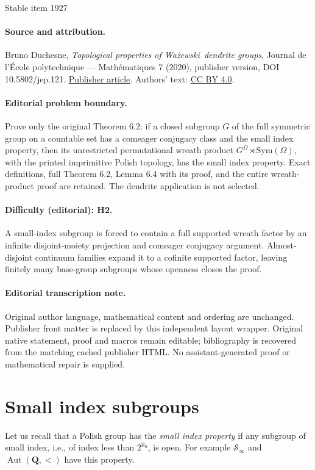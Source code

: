\documentclass[11pt]{article}
\newcommand{\ie}{i.e.,\xspace}
\let\mathcal\mathscr
\theoremstyle{plain}
\theoremstyle{definition}
\newcommand{\QQ}{\mathbf{Q}}
\newcommand{\cS}{\mathcal{S}}
\newcommand{\sinf}{\cS_\infty}
\DeclareMathOperator{\Aut}{Aut}
\begin{document}
\begin{center}{\Large Stable item 1927}\end{center}
\paragraph{Source and attribution.}
Bruno Duchesne, \emph{Topological properties of Ważewski dendrite groups}, Journal de l’École polytechnique — Mathématiques 7 (2020), publisher version, DOI 10.5802/jep.121. \href{https://jep.centre-mersenne.org/articles/10.5802/jep.121/}{Publisher article}. Authors' text: \href{https://creativecommons.org/licenses/by/4.0/}{CC BY 4.0}.
\paragraph{Editorial problem boundary.}
Prove only the original Theorem 6.2: if a closed subgroup \(G\) of the full symmetric group on a countable set has a comeager conjugacy class and the small index property, then its unrestricted permutational wreath product \(G^\Omega\rtimes\mathrm{Sym}(\Omega)\), with the printed imprimitive Polish topology, has the small index property. Exact definitions, full Theorem 6.2, Lemma 6.4 with its proof, and the entire wreath-product proof are retained. The dendrite application is not selected.
\paragraph{Difficulty (editorial): H2.}
A small-index subgroup is forced to contain a full supported wreath factor by an infinite disjoint-moiety projection and comeager conjugacy argument. Almost-disjoint continuum families expand it to a cofinite supported factor, leaving finitely many base-group subgroups whose openness closes the proof.
\paragraph{Editorial transcription note.}
Original author language, mathematical content and ordering are unchanged. Publisher front matter is replaced by this independent layout wrapper. Original native statement, proof and macros remain editable; bibliography is recovered from the matching cached publisher HTML. No assistant-generated proof or mathematical repair is supplied.
\clearpage
\setcounter{section}{5}

\section{Small index subgroups}
Let us recall that a Polish group has the \emph{small index property} if any subgroup of small index, \ie of index less than $2^{\aleph_0}$, is open. For example $\sinf$ and $\Aut(\QQ,<)$ have this property.
\end{document}
